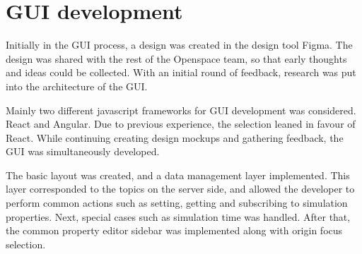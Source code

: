 \section{GUI development}

Initially in the GUI process, a design was created in the design tool Figma. The design was shared with the rest of the Openspace team, so that early thoughts and ideas could be collected. With an initial round of feedback, research was put into the architecture of the GUI.

Mainly two different javascript frameworks for GUI development was considered. React and Angular.  Due to previous experience, the selection leaned in favour of React. While continuing creating design mockups and gathering feedback, the GUI was simultaneously developed.

The basic layout was created, and a data management layer implemented. This layer corresponded to the topics on the server side, and allowed the developer to perform common actions such as setting, getting and subscribing to simulation properties. Next, special cases such as simulation time was handled. After that, the common property editor sidebar was implemented along with origin focus selection. 


